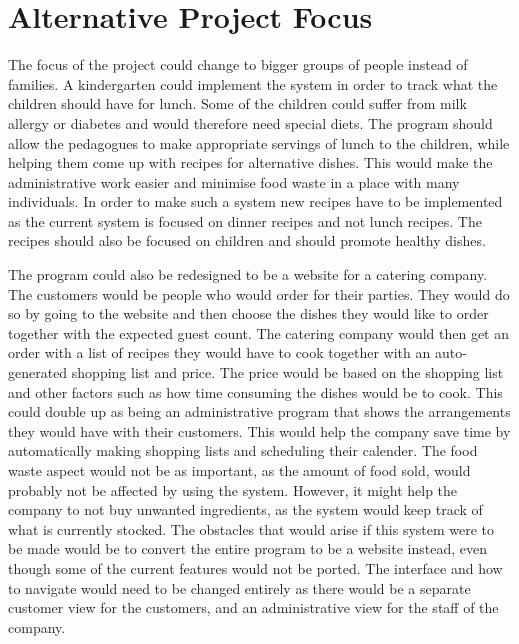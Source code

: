 \section{Alternative Project Focus}
The focus of the project could change to bigger groups of people instead of families. A kindergarten could implement the system in order to track what the children should have for lunch. Some of the children could suffer from milk allergy or diabetes and would therefore need special diets. The program should allow the pedagogues to make appropriate servings of lunch to the children, while helping them come up with recipes for alternative dishes. This would make the administrative work easier and minimise food waste in a place with many individuals. In order to make such a system new recipes have to be implemented as the current system is focused on dinner recipes and not lunch recipes. The recipes should also be focused on children and should promote healthy dishes.

The program could also be redesigned to be a website for a catering company. The customers would be people who would order for their parties. They would do so by going to the website and then choose the dishes they would like to order together with the expected guest count. The catering company would then get an order with a list of recipes they would have to cook together with an auto-generated shopping list and price. The price would be based on the shopping list and other factors such as how time consuming the dishes would be to cook. This could double up as being an administrative program that shows the arrangements they would have with their customers. This would help the company save time by automatically making shopping lists and scheduling their calender. The food waste aspect would not be as important, as the amount of food sold, would probably not be affected by using the system. However, it might help the company to not buy unwanted ingredients, as the system would keep track of what is currently stocked. The obstacles that would arise if this system were to be made would be to convert the entire program to be a website instead, even though some of the current features would not be ported. The interface and how to navigate would need to be changed entirely as there would be a separate customer view for the customers, and an administrative view for the staff of the company.